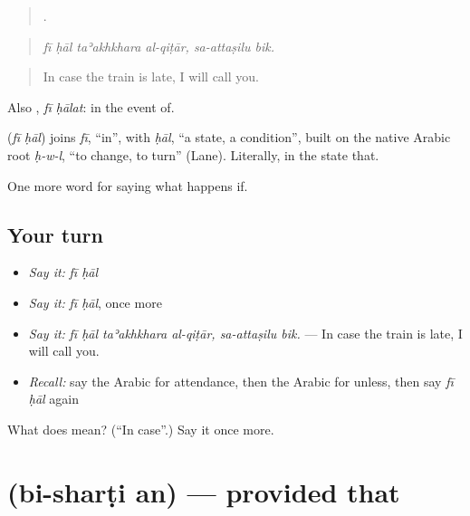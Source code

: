 \begin{quote}
     .
\end{quote}

\begin{quote}
\emph{fī ḥāl taʾakhkhara al-qiṭār, sa-attaṣilu bik.}
\end{quote}

\begin{quote}
In case the train is late, I will call you.
\end{quote}

Also  , \emph{fī ḥālat}: in the event of.

\begin{cousinweb}
\textbf{ } (\emph{fī ḥāl}) joins \emph{fī}, \textquotedblleft{}in\textquotedblright{}, with \emph{ḥāl}, \textquotedblleft{}a state, a condition\textquotedblright{}, built on the native Arabic root \emph{ḥ-w-l}, \textquotedblleft{}to change, to turn\textquotedblright{} (Lane). Literally, in the state that.
\end{cousinweb}

\begin{grammarlens}[title={What you've built}]
One more word for saying what happens if.
\end{grammarlens}

\subsection*{Your turn}
\begin{itemize}
\raggedright
  \item \emph{Say it:} \emph{fī ḥāl}
  \item \emph{Say it:} \emph{fī ḥāl}, once more
  \item \emph{Say it:} \emph{fī ḥāl taʾakhkhara al-qiṭār, sa-attaṣilu bik.} — In case the train is late, I will call you.
  \item \emph{Recall:} say the Arabic for attendance, then the Arabic for unless, then say \emph{fī ḥāl} again
\end{itemize}

\begin{tcolorbox}[breakable,colback=teal!4,colframe=teal!35!black,title={Before you move on}]
What does   mean? (\textquotedblleft{}In case\textquotedblright{}.) Say it once more.
\end{tcolorbox}
\section[\texorpdfstring{\ar{بشرط} \ar{أن} (bi-sharṭi an)}{بشرط أن (bi-sharṭi an)}]{  (bi-sharṭi an) — provided that}

